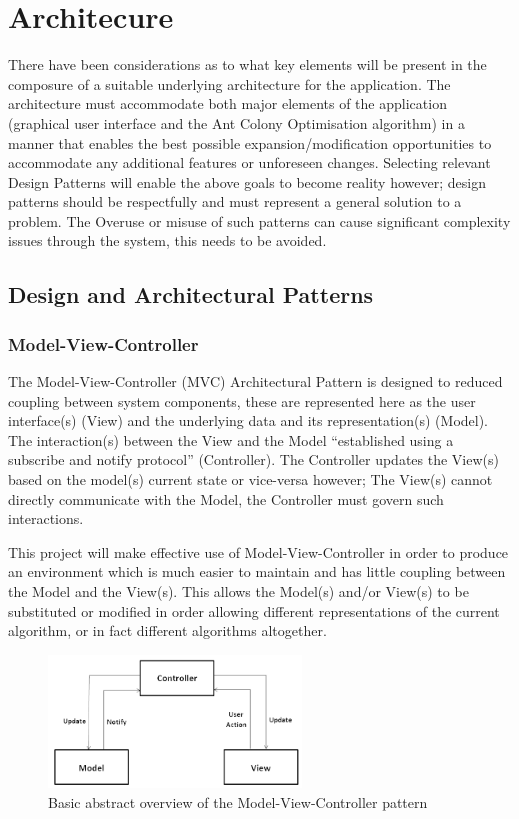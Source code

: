 \section{Architecure}

There have been considerations as to what key elements will be present in the composure of a suitable underlying architecture for the application. The architecture must accommodate both major elements of the application (graphical user interface and the Ant Colony Optimisation algorithm) in a manner that enables the best possible expansion/modification opportunities to accommodate any additional features or unforeseen changes. Selecting relevant Design Patterns will enable the above goals to become reality however; design patterns should be respectfully and must represent a general solution to a problem. The Overuse or misuse of such patterns can cause significant complexity issues through the system, this needs to be avoided. 

\subsection{Design and Architectural Patterns}

\subsubsection{Model-View-Controller}
\label{sssec:mvc}
\label{sec:patternsmvc}
The Model-View-Controller (MVC) Architectural Pattern is designed to reduced coupling between system components, these are represented here as the user interface(s) (View) and the underlying data and its representation(s) (Model). The interaction(s) between the View and the Model \enquote{established using a subscribe and notify protocol}\cite{gof:design:mvc} (Controller). The Controller updates the View(s) based on the model(s) current state or vice-versa however; The View(s) cannot directly communicate with the Model, the Controller must govern such interactions.

This project will make effective use of Model-View-Controller in order to produce an environment which is much easier to maintain and has little coupling between the Model and the View(s). This allows the Model(s) and/or View(s) to be substituted or modified in order allowing different representations of the current algorithm, or in fact different algorithms altogether. 

\begin{figure}[h]
\centering
\includegraphics[width=0.6\textwidth]{Images/mvc}
\caption{Basic abstract overview of the Model-View-Controller pattern}
\end{figure}

